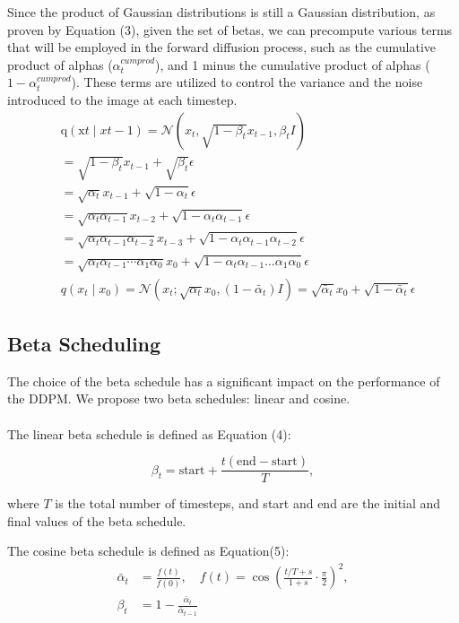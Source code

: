 \documentclass[letterpaper]{article} %
\begin{document}
Since the product of Gaussian distributions is still a Gaussian distribution, as proven by Equation (3)\cite{math}, given the set of betas, we can precompute various terms that will be employed in the forward diffusion process, such as the cumulative product of alphas ($\alpha^{cumprod}_t$), and 1 minus the cumulative product of alphas ($1-\alpha^{cumprod}_t$). These terms are utilized to control the variance and the noise introduced to the image at each timestep.
\begin{equation}
\begin{aligned}
& \mathrm{q}\left(\mathrm{x}t \mid x{t-1}\right)=\mathcal{N}\left(x_t, \sqrt{1-\beta_t} x_{t-1}, \beta_t I\right) \\
& =\sqrt{1-\beta_t} x_{t-1}+\sqrt{\beta_t} \epsilon \\
& =\sqrt{\alpha_t} x_{t-1}+\sqrt{1-\alpha_t} \epsilon \\
& =\sqrt{\alpha_t \alpha_{t-1}} x_{t-2}+\sqrt{1-\alpha_t \alpha_{t-1}} \epsilon \\
& =\sqrt{\alpha_t \alpha_{t-1} \alpha_{t-2}} x_{t-3}+\sqrt{1-\alpha_t \alpha_{t-1} \alpha_{t-2}} \epsilon \\
& =\sqrt{\alpha_t \alpha_{t-1} \cdots \alpha_1 \alpha_0} x_0+\sqrt{1-\alpha_t \alpha_{t-1} \ldots \alpha_1 \alpha_0} \epsilon \\
& q\left(x_t \mid x_0\right)=\mathcal{N}\left(x_t ; \sqrt{\alpha_t} x_0,\left(1-\bar{\alpha}_t\right) I\right) =\sqrt{\bar{\alpha}_t} x_0+\sqrt{1-\bar{\alpha}_t} \epsilon
\end{aligned}
\end{equation}

\subsection{Beta Scheduling}
The choice of the beta schedule has a significant impact on the performance of the DDPM. We propose two beta schedules: linear and cosine. \\\\
The linear beta schedule is defined as Equation (4):

\begin{equation}
\beta_t = \text{start} + \frac{t (\text{end} - \text{start})}{T},
\end{equation}

\noindent where $T$ is the total number of timesteps, and start and end are the initial and final values of the beta schedule.

\noindent The cosine beta schedule is defined as Equation(5):
\begin{equation}
\begin{aligned}
\bar{\alpha}_t &= \frac{f(t)}{f(0)}, \quad f(t) = \cos \left(\frac{t / T+s}{1+s} \cdot \frac{\pi}{2}\right)^2, \\
\beta_t &= 1-\frac{\bar{\alpha}_t}{\bar{\alpha}_{t-1}} \qquad
\end{aligned}
\end{equation}
\end{document}
